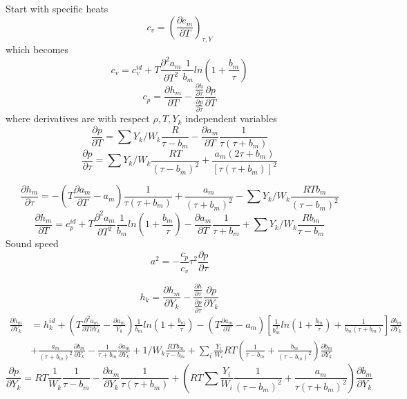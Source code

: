 \documentclass[11pt]{article}
\begin{document}
Start with specific heats
\[
c_v = \left( \frac{\partial e_m}{\partial T}\right)_{\tau,Y}
\]
which becomes
\[
c_v = c_v^{id} + T \frac{\partial^2 a_m}{\partial T^2} \frac{1}{b_m} ln ( 1 + \frac{b_m}{\tau})
\]
\[
c_p =  \frac{\partial h_m}{\partial T}
- \frac {\frac{\partial h}{\partial \tau}} 
 {\frac{\partial p}{\partial \tau}}
\frac{\partial p}{\partial T}
\]
where derivatives are with respect $\rho, T, Y_k$ independent variables
\[
\frac{\partial p}{\partial T} = \sum Y_k / W_k  \frac{R}{\tau-b_m} - \frac{\partial a_m}{\partial T} \frac{1}{\tau(\tau +b_m)}
\]
\[
\frac{\partial p}{\partial \tau} =
\sum Y_k / W_k  \frac{R T}{(\tau-b_m)^2} + \frac{a_m (2 \tau + b_m)}{[\tau(\tau +b_m)]^2}
\]

\vspace{\baselineskip}
\[
\frac{\partial h_m}{\partial \tau} =
-(T \frac{\partial a_m}{\partial T}  - a_m )
\frac{1}{\tau(\tau+b_m)}
+ \frac{a_m}{(\tau+b_m)^2}
-\sum Y_k / W_k  \frac{R T b_m}{(\tau-b_m)^2} 
\]
\vspace{\baselineskip}
\[
\frac{\partial h_m}{\partial T} = c_p^{id}
+T \frac{\partial^2 a_m}{\partial T^2} 
\frac{1}{b_m} ln ( 1 + \frac{b_m}{\tau})
- \frac{\partial a_m}{\partial T} 
\frac{1}{\tau+b_m}
+\sum Y_k / W_k  \frac{R b_m}{\tau-b_m} 
\]
Sound speed
\[
a^2 = -\frac{c_p}{c_v} \tau^2  \frac{\partial p}{\partial \tau}
\]

\[
h_k = \frac{\partial h_m}{\partial Y_k }
- \frac {\frac{\partial h}{\partial \tau}} 
 {\frac{\partial p}{\partial \tau}}
 \frac{\partial p}{\partial Y_k}
\]
\begin{align}
\frac{\partial h_m}{\partial Y_k } &=  h_k^{id}
+ (T \frac{\partial^2 a_m}{\partial T \partial Y_k}  - \frac{\partial a_m }{Y_k})
\frac{1}{b_m} ln(1+ \frac{b_m}{\tau})
-(T \frac{\partial a_m}{\partial T}  - a_m ) \left[ \frac{1}{b_m^2} ln(1+ \frac{b_m}{\tau})
+ \frac{1}{b_m(\tau+b_m)}
\right ] \frac{\partial b_m}{\partial Y_k} \nonumber \\
&+ \frac{a_m}{(\tau+b_m)^2}  \frac{\partial b_m}{\partial Y_k}
- \frac{1}{\tau+b_m}  \frac{\partial a_m}{\partial Y_k}
+ 1 / W_k  \frac{R T b_m}{\tau-b_m}+
\sum_i \frac{Y_i}{W_i} R T ( \frac{1}{\tau -b_m} + \frac{b_m}{(\tau-b_m)^2} ) \frac{ \partial b_m}{\partial Y_k} 
\end{align}
\[
 \frac{\partial p}{\partial Y_k}
= 
 R T \frac{1}{W_k} \frac{1}{\tau - b_m} - \frac{\partial a_m}{\partial Y_k} \frac{1}{\tau(\tau + b_m)}
+\left(R T \sum \frac{Y_i}{W_i} \frac{1}{(\tau - b_m)^2} + \frac{a_m}{\tau(\tau + b_m)^2} \right ) \frac{\partial b_m}{\partial Y_k}
\]
\end{document}
